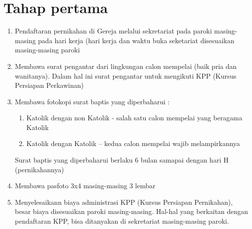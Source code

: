 
\section{Tahap pertama}
\begin{enumerate}
\item   Pendaftaran pernikahan di Gereja melalui sekretariat pada paroki masing-masing pada hari kerja (hari kerja dan waktu buka seketariat disesuaikan masing-masing paroki
\item    Membawa surat pengantar dari lingkungan calon mempelai (baik pria dan wanitanya). Dalam hal ini surat pengantar untuk mengikuti KPP (Kursus Persiapan Perkawinan)
\item    Membawa fotokopi surat baptis yang diperbaharui :
\begin{enumerate}
    \item    Katolik dengan non Katolik - salah satu calon mempelai yang beragama Katolik
    \item    Katolik dengan Katolik – kedua calon mempelai wajib melampirkannya
\end{enumerate}

   Surat baptis yang diperbaharui berlaku 6 bulan samapai dengan hari H (pernikahannya)

\item    Membawa pasfoto 3x4 masing-masing 3 lembar
\item    Menyelesaikann biaya administrasi KPP (Kursus Persiapan Pernikahan), besar biaya disesuaikan paroki masing-masing. Hal-hal yang berkaitan dengan pendaftaran KPP, bisa ditanyakan di sekretariat masing-masing paroki.
\end{enumerate}

